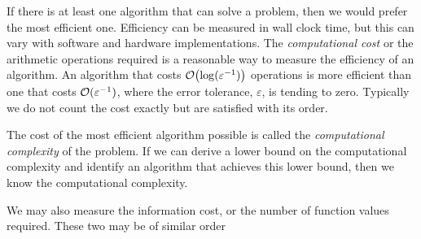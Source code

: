 If there is at least one algorithm that can solve a problem, then we would prefer the most efficient one.  Efficiency can be measured in wall clock time, but this can vary with software and hardware implementations.  The \emph{computational cost} or the arithmetic operations required is a reasonable way to measure the efficiency of an algorithm.  An algorithm that costs $\operatorname{{\mathcal O}}\bigl(\log(\varepsilon^{-1})\bigr)$ operations is more efficient than one that costs $\operatorname{{\mathcal O}}(\varepsilon^{-1})$, where the error tolerance, $\varepsilon$, is tending to zero. Typically we do not count the cost exactly but are satisfied with its order.

The cost of the most efficient algorithm possible is called the \emph{computational complexity} of the problem.  If we can derive a lower bound on the computational complexity and identify an algorithm that achieves this lower bound, then we know the computational complexity.

We may also measure the information cost, or the number of function values required.  These two may be of similar order

